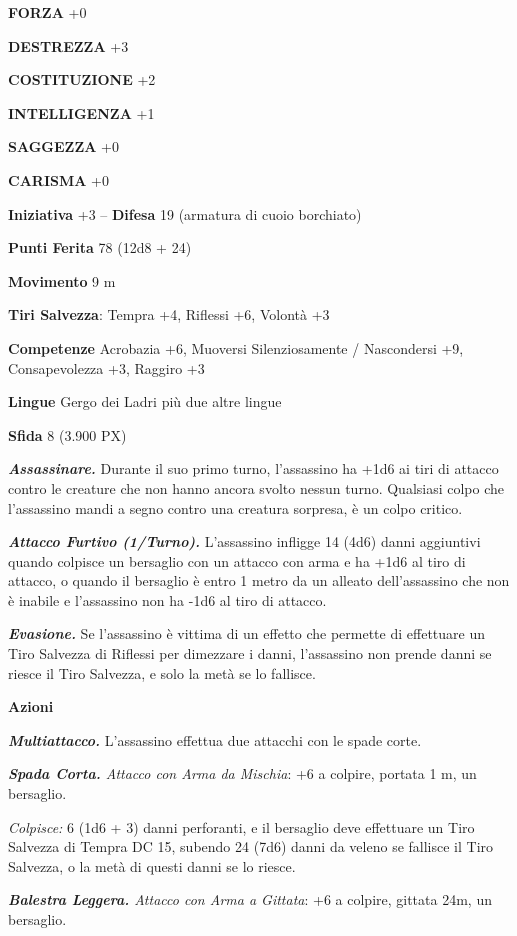 \begin{multicols}{2}
	\textbf{FORZA} +0

	\textbf{DESTREZZA} +3

	\textbf{COSTITUZIONE} +2

	\textbf{INTELLIGENZA} +1

	\textbf{SAGGEZZA} +0

	\textbf{CARISMA} +0

	\textbf{Iniziativa} +3 -- \textbf{Difesa} 19 (armatura di cuoio borchiato)

	\textbf{Punti Ferita} 78 (12d8 + 24)

	\textbf{Movimento} 9 m

	\textbf{Tiri Salvezza}: Tempra +4, Riflessi +6, Volontà +3

	\textbf{Competenze} Acrobazia +6, Muoversi Silenziosamente / Nascondersi +9, Consapevolezza +3, Raggiro +3


	\textbf{Lingue} Gergo dei Ladri più due altre lingue

	\textbf{Sfida} 8 (3.900 PX)

	\textit{\textbf{Assassinare.}} Durante il suo primo turno, l'assassino ha +1d6 ai tiri di attacco contro le creature che non hanno ancora svolto nessun turno. Qualsiasi colpo che l'assassino mandi a segno contro una creatura sorpresa, è un colpo critico.

	\textit{\textbf{Attacco Furtivo (1/Turno).}} L'assassino infligge 14 (4d6) danni aggiuntivi quando colpisce un bersaglio con un attacco con arma e ha +1d6 al tiro di attacco, o quando il bersaglio è entro 1 metro da un alleato dell'assassino che non è inabile e l'assassino non ha -1d6 al tiro di attacco.

	\textit{\textbf{Evasione.}} Se l'assassino è vittima di un effetto che permette di effettuare un Tiro Salvezza di Riflessi per dimezzare i danni, l'assassino non prende danni se riesce il Tiro Salvezza, e solo la metà se lo fallisce.

	\textbf{Azioni}

	\textit{\textbf{Multiattacco.}} L'assassino effettua due attacchi con le spade corte.

	\textit{\textbf{Spada Corta.} Attacco con Arma da Mischia}: +6 a colpire, portata 1 m, un bersaglio.

	\textit{Colpisce:} 6 (1d6 + 3) danni perforanti, e il bersaglio deve effettuare un Tiro Salvezza di Tempra DC 15, subendo 24 (7d6) danni da veleno se fallisce il Tiro Salvezza, o la metà di questi danni se lo riesce.

	\textit{\textbf{Balestra Leggera.} Attacco con Arma a Gittata}: +6 a colpire, gittata 24m, un bersaglio.


\end{multicols}

